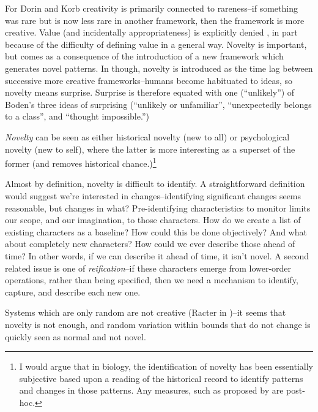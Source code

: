 \begin{mdframed}[style=box, frametitle={Creativity, and its relationship to Novelty, Surprise, and Value}]
For Dorin and Korb \cite{Dorin2009} creativity is primarily connected to rareness--if something was rare but is now less rare in another framework, then the framework is more creative. Value (and incidentally appropriateness) is explicitly denied \cite[p.18]{Dorin2009}, in part because of the difficulty of defining value in a general way. Novelty is important, but comes as a consequence of the introduction of a new framework which generates novel patterns. In \cite[p.16]{Dorin2009} though, novelty is introduced as the time lag between successive more creative frameworks--humans become habituated to ideas, so novelty means surprise. Surprise is therefore equated with one (``unlikely'') of Boden's three ideas of surprising (``unlikely or unfamiliar'', ``unexpectedly belongs to a class'', and ``thought impossible.'')

\emph{Novelty} can be seen as either historical novelty (new to all) or psychological novelty (new to self), where the latter is more interesting as a superset of the former (and removes historical chance.)\footnote{I would argue that in biology, the identification of novelty has been essentially subjective based upon a reading of the historical record to identify patterns and changes in those patterns. Any measures, such as proposed by \cite{McShea1998,Maynard-Smith:1995lw,Walker2012} are post-hoc.}

Almost by definition, novelty is difficult to identify. A straightforward definition would suggest we're interested in changes--identifying significant changes seems reasonable, but changes in what? Pre-identifying characteristics to monitor limits our scope, and our imagination, to those characters. How do we create a list of existing characters as a baseline? How could this be done objectively? And what about completely new characters? How could we ever describe those ahead of time? In other words, if we can describe it ahead of time, it isn't novel. A second related issue is one of \textit{reification}--if these characters emerge from lower-order operations, rather than being specified, then we need a mechanism to identify, capture, and describe each new one.

Systems which are only random are not creative (\eg Racter in \cite[p.16]{Dorin2009})--it seems that novelty is not enough, and random variation within bounds that do not change is quickly seen as normal and not novel. 


\end{mdframed}
